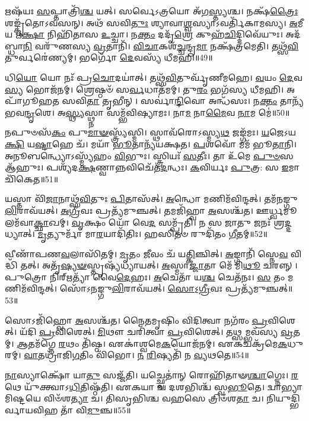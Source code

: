 𑌋𑌷᳴𑌯𑌃 \ul{𑌸}\-𑌪𑍍𑌤𑌾𑌤𑍍𑌰𑌿᳴\-\ul{𑌶𑍍𑌚} 𑌯𑌤𑍍। 𑌸𑌰𑍍𑌵𑍇𑌽𑌤𑍍𑌰𑌯𑍋 𑌅᳴𑌗\-\ul{𑌸𑍍𑌤𑍍𑌯}\-𑌶𑍍𑌚। 
𑌨𑌕𑍍𑌷᳴\-\ul{𑌤𑍍𑌰𑍈𑌃} 𑌶𑌙𑍍𑌕𑍃᳴𑌤𑍋𑌽𑌵𑌸𑌨𑍍। 𑌅𑌥᳴ 𑌸𑌵𑌿\-\ul{𑌤𑍁𑌃} 𑌶𑍍𑌯𑌾𑌵𑌾\-\ul{𑌶𑍍𑌵}\-𑌸𑍍𑌯𑌾𑌽𑌵𑌰𑍍𑌤𑌿᳴𑌕𑌾𑌮𑌸𑍍𑌯। 
\-\ul{𑌅}\-𑌮𑍀 𑌯 𑌋\-\ul{𑌕𑍍𑌷𑌾} 𑌨𑌿𑌹𑌿᳴𑌤𑌾𑌸 \ul{𑌉}\-𑌚𑍍𑌚𑌾। 𑌨\-\ul{𑌕𑍍𑌤𑌂} 𑌦𑌦𑍃᳴\-\ul{𑌶𑍍𑌰𑍇} 𑌕𑍁𑌹᳴\-\ul{𑌚𑌿}\-𑌦𑍍𑌦𑌿𑌵𑍇᳴𑌯𑍁𑌃। 
𑌅𑌦᳴𑌬𑍍𑌧𑌾\-\ul{𑌨𑌿} 𑌵𑌰𑍁᳴𑌣𑌸𑍍𑌯 \ul{𑌵𑍍𑌰}\-𑌤𑌾𑌨𑌿᳴। \ul{𑌵𑌿}\-\-\ul{𑌚𑌾}\-𑌕𑌶᳴\-\ul{𑌚𑍍𑌚}\-𑌨𑍍𑌦𑍍𑌰\-\ul{𑌮𑌾} 𑌨𑌕𑍍𑌷᳴𑌤𑍍𑌰𑌮𑍇𑌤𑌿। 
𑌤𑌥𑍍𑌸᳴\-\ul{𑌵𑌿}\-𑌤𑍁𑌰𑍍𑌵𑌰𑍇॑𑌣𑍍𑌯𑌮𑍍। 𑌭𑌰𑍍𑌗𑍋᳴ \ul{𑌦𑍇}\-𑌵𑌸𑍍𑌯᳴ 𑌧𑍀𑌮𑌹𑌿॥49॥


𑌧𑌿\-\ul{𑌯𑍋} 𑌯𑍋 𑌨𑌃᳴ 𑌪𑍍𑌰\-\ul{𑌚𑍋}\-𑌦𑌯𑌾॑𑌤𑍍। 𑌤𑌥𑍍𑌸᳴\-\ul{𑌵𑌿}\-𑌤𑍁𑌰𑍍𑌵𑍃᳴𑌣𑍀𑌮𑌹𑍇। 
\-\ul{𑌵}\-𑌯𑌂 \ul{𑌦𑍇}\-𑌵\-\ul{𑌸𑍍𑌯} 𑌭𑍋𑌜᳴𑌨𑌮𑍍। 𑌶𑍍𑌰𑍇𑌷𑍍𑌠𑍞᳴ 𑌸\-\ul{𑌰𑍍𑌵}\-𑌧𑌾𑌤᳴𑌮𑌮𑍍। 
𑌤𑍁\-\ul{𑌰𑌂} 𑌭𑌗᳴𑌸𑍍𑌯 𑌧𑍀𑌮𑌹𑌿। 𑌅𑌪𑌾᳴𑌗𑍂𑌹𑌤 𑌸𑌵𑌿\-\ul{𑌤𑌾} 𑌤𑍃𑌭𑍀𑌨𑍍। 
𑌸𑌰𑍍𑌵𑌾॑\-\ul{𑌨𑍍𑌦𑌿}\-𑌵𑍋 𑌅𑌨𑍍𑌧᳴𑌸𑌃। 𑌨\-\ul{𑌕𑍍𑌤𑌂} 𑌤𑌾𑌨𑍍𑌯᳴\-𑌭𑌵\-\ul{𑌨𑍍𑌦𑍃}\-𑌶𑍇। 
𑌅\-\ul{𑌸𑍍𑌥𑍍𑌯}\-𑌸𑍍𑌥𑍍𑌨𑌾 𑌸𑌮𑍍𑌭᳴𑌵𑌿𑌷𑍍𑌯𑌾𑌮𑌃। 𑌨𑌾\-\ul{𑌮} 𑌨𑌾\-\ul{𑌮𑍈}\-𑌵 \ul{𑌨𑌾}\-𑌮 𑌮𑍇॑॥50॥


𑌨𑌪𑍁𑍞𑌸᳴\-\ul{𑌕𑌂} 𑌪𑍁\-\ul{𑌮𑌾}\-\-\ul{𑍟}\-𑌸𑍍𑌤𑍍𑌰𑍍𑌯᳴𑌸𑍍𑌮𑌿। 𑌸𑍍𑌥𑌾𑌵᳴𑌰𑍋𑌽𑌸𑍍𑌮𑍍𑌯\-\ul{𑌥} 𑌜𑌙𑍍𑌗᳴𑌮𑌃। 
\-\ul{𑌯}\-𑌜𑍇𑌽𑌯\-\ul{𑌕𑍍𑌷𑌿} 𑌯\-\ul{𑌷𑍍𑌟𑌾}\-𑌹𑍇 𑌚᳴। 𑌮𑌯𑌾᳴ \ul{𑌭𑍂}\-𑌤𑌾𑌨𑍍𑌯᳴𑌯𑌕𑍍𑌷𑌤। 
\-\ul{𑌪}\-𑌶𑌵𑍋᳴ 𑌮𑌮᳴ 𑌭𑍂\-\ul{𑌤𑌾}\-𑌨𑌿। 𑌅𑌨𑍂𑌬𑌨𑍍𑌧𑍍𑌯𑍋𑌽𑌸𑍍𑌮𑍍𑌯᳴𑌹𑌂 \ul{𑌵𑌿}\-𑌭𑍁𑌃। 
𑌸𑍍𑌤𑍍𑌰𑌿𑌯𑌃᳴ \ul{𑌸}\-𑌤𑍀𑌃। 𑌤𑌾 𑌉᳴𑌮𑍇 \ul{𑌪𑍁}\-\-\ul{𑍞}\-𑌸 𑌆᳴𑌹𑍁𑌃। 
𑌪𑌶𑍍𑌯᳴𑌦\-\ul{𑌕𑍍𑌷}\-𑌣𑍍𑌵𑌾𑌨𑍍𑌨𑌵𑌿𑌚𑍇᳴𑌤\-\ul{𑌦}\-𑌨𑍍𑌧𑌃। \ul{𑌕}\-𑌵𑌿𑌰𑍍𑌯𑌃 \ul{𑌪𑍁}\-𑌤𑍍𑌰: 𑌸 \ul{𑌇}\-𑌮𑌾 𑌚𑌿᳴𑌕𑍇𑌤॥51॥


𑌯𑌸𑍍𑌤𑌾 𑌵𑌿᳴\-\ul{𑌜𑌾}\-𑌨𑌾𑌥𑍍𑌸᳴\-\ul{𑌵𑌿}\-𑌤𑍁𑌃 \ul{𑌪𑌿}\-𑌤𑌾𑌸᳴𑌤𑍍। \ul{𑌅}\-𑌨𑍍𑌧𑍋 𑌮𑌣𑌿𑌮᳴𑌵𑌿𑌨𑍍𑌦𑌤𑍍। 
𑌤𑌮᳴𑌨𑌙𑍍𑌗𑍁\-\ul{𑌲𑌿}\-𑌰𑌾𑌵᳴𑌯𑌤𑍍। \ul{𑌅}\-\-\ul{𑌗𑍍𑌰𑍀}\-𑌵𑌃 𑌪𑍍𑌰𑌤𑍍𑌯᳴𑌮𑍁𑌞𑍍𑌚𑌤𑍍। 
𑌤𑌮𑌜𑌿᳴𑌹𑍍𑌵𑌾 \ul{𑌅}\-𑌸𑌶𑍍𑌚᳴𑌤। 𑌊𑌰𑍍𑌧𑍍𑌵𑌮𑍂𑌲𑌮᳴𑌵𑌾\-\ul{𑌕𑍍𑌛𑌾}\-𑌖𑌮𑍍। 
\-\ul{𑌵𑍃}\-𑌕𑍍𑌷𑌂 𑌯𑍋᳴ 𑌵𑍇\-\ul{𑌦} 𑌸𑌮𑍍𑌪𑍍𑌰᳴𑌤𑌿। 𑌨 𑌸 𑌜𑌾𑌤𑍁 𑌜𑌨𑌃᳴ 𑌶𑍍𑌰\-\ul{𑌦𑍍𑌦}\-𑌧𑍍𑌯𑌾𑌤𑍍। 
\-\ul{𑌮𑍃}\-𑌤𑍍𑌯𑍁𑌰𑍍𑌮𑌾᳴ 𑌮𑌾\-\ul{𑌰}\-𑌯𑌾𑌦𑌿᳴𑌤𑌿𑌃। 𑌹𑌸𑌿𑌤𑍞 𑌰𑍁𑌦𑌿᳴𑌤𑌂 \ul{𑌗𑍀}\-𑌤𑌮𑍍॥52॥


𑌵𑍀𑌣𑌾᳴𑌪𑌣\-\ul{𑌵}\-𑌲𑌾𑌸𑌿᳴𑌤𑌮𑍍। \ul{𑌮𑍃}\-𑌤𑌂 \ul{𑌜𑍀}\-𑌵𑌂 𑌚᳴ 𑌯\-\ul{𑌤𑍍𑌕𑌿}\-𑌞𑍍𑌚𑌿𑌤𑍍। 
\-\ul{𑌅}\-𑌙𑍍𑌗𑌾𑌨𑌿᳴ 𑌸𑍍𑌨𑍇\-\ul{𑌵} 𑌵𑌿𑌦𑍍𑌧𑌿᳴ 𑌤𑌤𑍍। 𑌅𑌤𑍃᳴\-\ul{𑌷𑍍𑌯}\-\-\ul{𑍟}\-𑌸𑍍𑌤𑍃𑌷𑍍𑌯᳴𑌧𑍍𑌯𑌾𑌯𑌤𑍍। 
\-\ul{𑌅}\-𑌸𑍍𑌮𑌾\-\ul{𑌜𑍍𑌜𑌾}\-𑌤𑌾 𑌮𑍇᳴ 𑌮𑌿\-\ul{𑌥𑍂} 𑌚𑌰𑌨𑍍𑌨𑍍। 𑌪𑍁𑌤𑍍𑌰𑍋 𑌨𑌿𑌰𑍍‌𑌋𑌤𑍍𑌯𑌾᳴ 𑌵𑍈\-\ul{𑌦𑍇}\-𑌹𑌃। 
\-\ul{𑌅}\-𑌚𑍇𑌤𑌾᳴ 𑌯\-\ul{𑌶𑍍𑌚} 𑌚𑍇𑌤᳴𑌨𑌃। \ul{𑌸} 𑌤𑌂 𑌮𑌣𑌿𑌮᳴𑌵𑌿𑌨𑍍𑌦𑌤𑍍। 
𑌸𑍋᳴𑌽𑌨𑌙𑍍𑌗𑍁\-\ul{𑌲𑌿}\-𑌰𑌾𑌵᳴𑌯𑌤𑍍। \ul{𑌸𑍋}\-𑌽॒\-\ul{𑌗𑍍𑌰𑍀}\-𑌵𑌃 𑌪𑍍𑌰𑌤𑍍𑌯᳴𑌮𑍁𑌞𑍍𑌚𑌤𑍍॥53॥


𑌸𑍋𑌽𑌜𑌿᳴𑌹𑍍𑌵𑍋 \ul{𑌅}\-𑌸𑌶𑍍𑌚᳴𑌤। 𑌨𑍈𑌤𑌮𑍃𑌷𑌿𑌂 𑌵𑌿𑌦𑌿𑌤𑍍𑌵𑌾 𑌨𑌗᳴𑌰𑌂 \ul{𑌪𑍍𑌰}\-𑌵𑌿𑌶𑍇𑌤𑍍। 
𑌯᳴𑌦𑌿 \ul{𑌪𑍍𑌰}\-𑌵𑌿𑌶𑍇𑌤𑍍। \ul{𑌮𑌿}\-𑌥𑍗 𑌚𑌰𑌿᳴𑌤𑍍𑌵𑌾 \ul{𑌪𑍍𑌰}\-𑌵𑌿𑌶𑍇𑌤𑍍। 
𑌤𑌥𑍍𑌸𑌮𑍍𑌭𑌵᳴𑌸𑍍𑌯 \ul{𑌵𑍍𑌰}\-𑌤𑌮𑍍। \ul{𑌆}\-𑌤𑌮᳴𑌗𑍍𑌨𑍇 \ul{𑌰}\-𑌥𑌂 𑌤𑌿᳴𑌷𑍍𑌠। 
𑌏𑌕𑌾॑𑌶𑍍𑌵𑌮𑍇\-\ul{𑌕}\-𑌯𑍋𑌜᳴𑌨𑌮𑍍। 𑌏𑌕𑌚𑌕𑍍𑌰᳴𑌮𑍇\-\ul{𑌕}\-𑌧𑍁𑌰𑌮𑍍। 
\-\ul{𑌵𑌾}\-𑌤𑌧𑍍𑌰𑌾᳴𑌜𑌿\-\ul{𑌗}\-𑌤𑌿𑌂 𑌵𑌿᳴𑌭𑍋। \ul{𑌨} \ul{𑌰𑌿}\-𑌷𑍍𑌯𑌤𑌿᳴ 𑌨 \ul{𑌵𑍍𑌯}\-𑌥𑌤𑍇॥54॥


\-\ul{𑌨𑌾}\-𑌸𑍍𑌯𑌾𑌕𑍍𑌷𑍋᳴ 𑌯𑌾\-\ul{𑌤𑍁} 𑌸𑌜𑍍𑌜᳴𑌤𑌿। 𑌯𑌚𑍍𑌛𑍍𑌵𑍇𑌤𑌾॑𑌨𑍍‌ 𑌰𑍋𑌹𑌿᳴𑌤𑌾𑍟\-\ul{𑌶𑍍𑌚𑌾}\-𑌗𑍍𑌨𑍇𑌃। 
\-\ul{𑌰}\-𑌥𑍇 𑌯𑍁᳴𑌕𑍍𑌤𑍍𑌵𑌾𑌽\-\ul{𑌧𑌿}\-\-𑌤𑌿𑌷𑍍𑌠᳴𑌤𑌿। 𑌏𑌕𑌯𑌾 𑌚 𑌦𑌶𑌭𑌿𑌶𑍍𑌚᳴ 𑌸𑍍𑌵\-\ul{𑌭𑍂}\-𑌤𑍇। 
𑌦𑍍𑌵𑌾𑌭𑍍𑌯𑌾𑌮𑌿𑌷𑍍𑌟𑌯𑍇 𑌵𑌿𑍞᳴𑌶\-\ul{𑌤𑍍𑌯𑌾} 𑌚। 𑌤𑌿𑌸𑍃𑌭𑌿𑌶𑍍𑌚 𑌵𑌹𑌸𑍇 𑌤𑍍𑌰𑌿𑍞᳴𑌶\-\ul{𑌤𑌾} 𑌚। 
𑌨𑌿𑌯𑍁𑌦𑍍𑌭𑌿𑌰𑍍𑌵𑌾𑌯𑌵𑌿𑌹 𑌤𑌾᳴ 𑌵𑌿\-\ul{𑌮𑍁}\-𑌞𑍍𑌚॥55॥\anuvakamend


